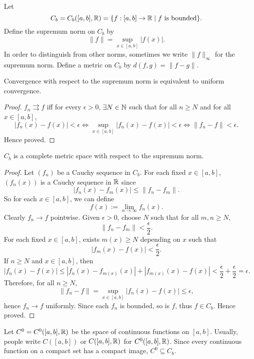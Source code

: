 Let
\[
C_b = C_b([a, b], {\mathbb R}) = {\left\{{f: [a, b] \to {\mathbb R} \mid \text{$f$ is bounded}}\right\}}.
\]
Define the supremum norm on $C_b$ by
\[
\|f\| = \sup_{x \in [a, b]} |f(x)|.
\]
In order to distinguish from other norms, sometimes we write $\|f\|_\infty$ for the supremum norm. Define a metric on $C_b$ by $d(f, g) = \|f - g\|$.

\begin{prop}
    Convergence with respect to the supremum norm is equivalent to uniform convergence.
    \begin{proof}
        $f_n \rightrightarrows f$ iff for every $\epsilon > 0$, $\exists N \in {\mathbb N}$ such that for all $n \geq N$ and for all $x \in [a, b]$,
        \[
        |f_n(x) - f(x)| < \epsilon \iff \sup_{x \in [a, b]} |f_n(x) - f(x)| < \epsilon \iff \|f_n - f\| < \epsilon.
        \]
        Hence proved.
    \end{proof}
\end{prop}

\begin{thm}
    $C_b$ is a complete metric space with respect to the supremum norm.
    \begin{proof}
        Let $(f_n)$ be a Cauchy sequence in $C_b$. For each fixed $x \in [a, b]$, $(f_n(x))$ is a Cauchy sequence in ${\mathbb R}$ since
        \[
        |f_n(x) - f_m(x)| \leq \|f_n - f_m\|.
        \]
        So for each $x \in [a, b]$, we can define
        \[
        f(x) := \lim_{n \to \infty} f_n(x).
        \]
        Clearly $f_n \to f$ pointwise. Given $\epsilon > 0$, choose $N$ such that for all $m, n \geq N$,
        \[
        \|f_n - f_m\| < \frac{\epsilon}{2}.
        \]
        For each fixed $x \in [a, b]$, exists $m(x) \geq N$ depending on $x$ such that
        \[
        |f_m(x) - f(x)| < \frac{\epsilon}{2}.
        \]
        If $n \geq N$ and $x \in [a, b]$, then
        \[
        |f_n(x) - f(x)| \leq |f_n(x) - f_{m(x)}(x)| + |f_{m(x)}(x) - f(x)| < \frac{\epsilon}{2} + \frac{\epsilon}{2} = \epsilon.
        \]
        Therefore, for all $n \geq N$,
        \[
        \|f_n - f\| = \sup_{x \in [a, b]} |f_n(x) - f(x)| \leq \epsilon,
        \]
        hence $f_n \to f$ uniformly. Since each $f_n$ is bounded, so is $f$, thus $f \in C_b$. Hence proved.
    \end{proof}
\end{thm}

Let $C^0 = C^0([a, b], {\mathbb R})$ be the space of continuous functions on $[a, b]$. Usually, people write $C([a, b])$ or $C([a, b], {\mathbb R})$ for $C^0([a, b], {\mathbb R})$. Since every continuous function on a compact set has a compact image, $C^0 \subseteq C_b$. 

